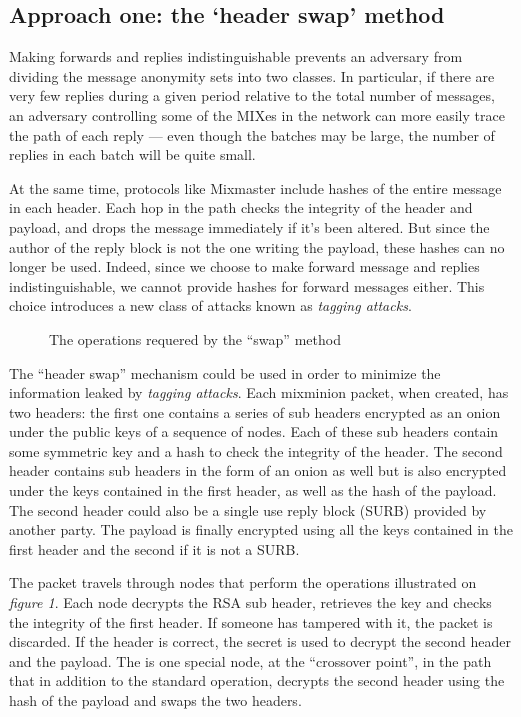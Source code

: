 \documentclass{llncs}
\begin{document}
\subsection{Approach one: the `header swap' method}
\label{subsec:header-swap}

Making forwards and replies indistinguishable prevents an adversary from
dividing the message anonymity sets into two classes. In particular, if
there are very few replies during a given period relative to the total
number of messages, an adversary controlling some of the MIXes in the
network can more easily trace the path of each reply --- even though
the batches may be large, the number of replies in each batch will be
quite small.

At the same time, protocols like Mixmaster include hashes of the entire
message in each header. Each hop in the path checks the integrity of
the header and payload, and drops the message immediately if it's been
altered. But since the author of the reply block is not the one writing
the payload, these hashes can no longer be used. Indeed, since we choose
to make forward message and replies indistinguishable, we cannot provide
hashes for forward messages either. This choice introduces a new class
of attacks known as \emph{tagging attacks}.

\begin{figure}
\begin{center}
\caption{The operations requered by the ``swap'' method} 
\end{center}
\end{figure}

The ``header swap'' mechanism could be used in order to minimize the
information leaked by \emph{tagging attacks}. Each mixminion packet,
when created, has two headers: the first one contains a series of sub
headers encrypted as an onion under the public keys of a sequence of
nodes. Each of these sub headers contain some symmetric key and a hash
to check the integrity of the header. The second header contains sub
headers in the form of an onion as well but is also encrypted under
the keys contained in the first header, as well as the hash of the
payload. The second header could also be a single use reply block (SURB)
provided by another party. The payload is finally encrypted using all
the keys contained in the first header and the second if it is not a SURB.

The packet travels through nodes that perform the operations illustrated
on \emph{figure 1}. Each node decrypts the RSA sub header, retrieves
the key and checks the integrity of the first header. If someone has
tampered with it, the packet is discarded. If the header is correct,
the secret is used to decrypt the second header and the payload. The
is one special node, at the ``crossover point'', in the path that in
addition to the standard operation, decrypts the second header using
the hash of the payload and swaps the two headers.
\end{document}
